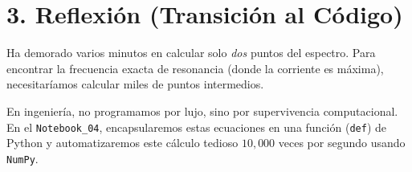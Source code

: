 \documentclass[11pt,a4paper]{article}
\begin{document}
\section*{3. Reflexión (Transición al Código)}
Ha demorado varios minutos en calcular solo \textit{dos} puntos del espectro. Para encontrar la frecuencia exacta de resonancia (donde la corriente es máxima), necesitaríamos calcular miles de puntos intermedios.
\begin{tcolorbox}[colback=red!5!white,colframe=UCBred,title=\textbf{El Propósito de la Programación Modular}]
En ingeniería, no programamos por lujo, sino por supervivencia computacional. En el \texttt{Notebook\_04}, encapsularemos estas ecuaciones en una función (\texttt{def}) de Python y automatizaremos este cálculo tedioso $10,000$ veces por segundo usando \texttt{NumPy}.
\end{tcolorbox}
\end{document}
